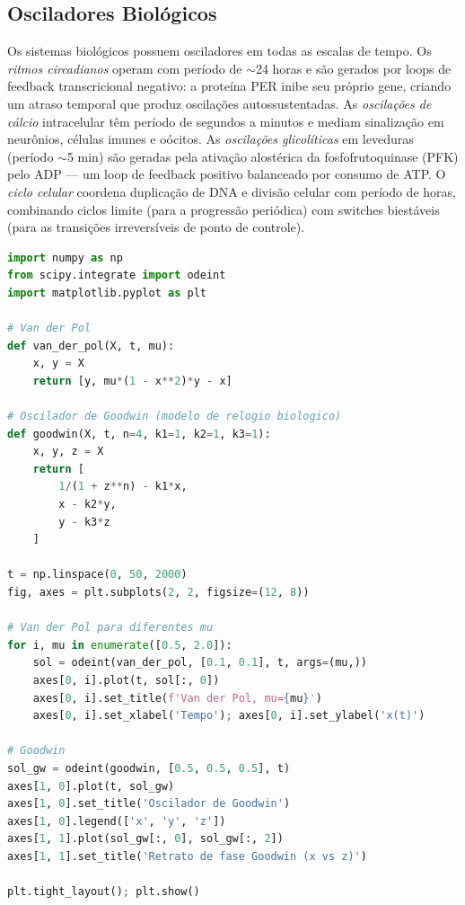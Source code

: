 \subsection{Osciladores Biológicos}

Os sistemas biológicos possuem osciladores em todas as escalas de tempo. Os
\emph{ritmos circadianos} operam com período de $\sim$24 horas e são gerados por loops de
feedback transcricional negativo: a proteína PER inibe seu próprio gene, criando um atraso
temporal que produz oscilações autossustentadas. As \emph{oscilações de cálcio} intracelular
têm período de segundos a minutos e mediam sinalização em neurônios, células imunes e
oócitos. As \emph{oscilações glicolíticas} em leveduras (período $\sim$5 min) são geradas
pela ativação alostérica da fosfofrutoquinase (PFK) pelo ADP --- um loop de feedback
positivo balanceado por consumo de ATP. O \emph{ciclo celular} coordena duplicação de DNA e
divisão celular com período de horas, combinando ciclos limite (para a progressão periódica)
com switches biestáveis (para as transições irreversíveis de ponto de controle).

\begin{lstlisting}[language=Python, caption=Oscilador de Van der Pol e Goodwin]
import numpy as np
from scipy.integrate import odeint
import matplotlib.pyplot as plt

# Van der Pol
def van_der_pol(X, t, mu):
    x, y = X
    return [y, mu*(1 - x**2)*y - x]

# Oscilador de Goodwin (modelo de relogio biologico)
def goodwin(X, t, n=4, k1=1, k2=1, k3=1):
    x, y, z = X
    return [
        1/(1 + z**n) - k1*x,
        x - k2*y,
        y - k3*z
    ]

t = np.linspace(0, 50, 2000)
fig, axes = plt.subplots(2, 2, figsize=(12, 8))

# Van der Pol para diferentes mu
for i, mu in enumerate([0.5, 2.0]):
    sol = odeint(van_der_pol, [0.1, 0.1], t, args=(mu,))
    axes[0, i].plot(t, sol[:, 0])
    axes[0, i].set_title(f'Van der Pol, mu={mu}')
    axes[0, i].set_xlabel('Tempo'); axes[0, i].set_ylabel('x(t)')

# Goodwin
sol_gw = odeint(goodwin, [0.5, 0.5, 0.5], t)
axes[1, 0].plot(t, sol_gw)
axes[1, 0].set_title('Oscilador de Goodwin')
axes[1, 0].legend(['x', 'y', 'z'])
axes[1, 1].plot(sol_gw[:, 0], sol_gw[:, 2])
axes[1, 1].set_title('Retrato de fase Goodwin (x vs z)')

plt.tight_layout(); plt.show()
\end{lstlisting}


